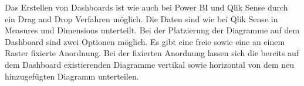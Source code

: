 Das Erstellen von Dashboards ist wie auch bei Power BI und Qlik Sense durch ein Drag and Drop Verfahren möglich.
Die Daten sind wie bei Qlik Sense in Measures und Dimensions unterteilt. Bei der Platzierung der Diagramme auf dem
Dashboard sind zwei Optionen möglich. Es gibt eine freie sowie eine an einem Raster fixierte Anordnung. Bei der fixierten
Anordnung lassen sich die bereits auf dem Dashboard existierenden Diagramme vertikal sowie horizontal von dem neu 
hinzugefügten Diagramm unterteilen.
